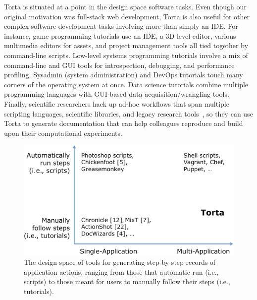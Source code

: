 Torta is situated at a point in the design space  software tasks.
%
%
Even though our original motivation was full-stack
web development, Torta is also useful for other complex software
development tasks involving more than simply an IDE. For instance,
game programming tutorials use an IDE, a 3D level editor, various
multimedia editors for assets, and project management tools all tied
together by command-line scripts. Low-level systems programming
tutorials involve a mix of command-line and GUI tools for introspection,
debugging, and performance profiling. Sysadmin (system administration)
and DevOps tutorials touch many corners of the operating system at once.
Data science tutorials combine multiple programming languages with
GUI-based data acquisition/wrangling tools. Finally, scientific
researchers hack up ad-hoc workflows that span multiple scripting
languages, scientific libraries, and legacy research
tools~\cite{GuoPhD2012}, so they can use Torta to generate documentation
that can help colleagues reproduce and build upon their computational
experiments.
%


\begin{figure}

\includegraphics[width=\columnwidth]{figures/torta/design-space.png}

\nocite{Bolin2005} %
\caption{The design space of tools for generating step-by-step records
of application actions, ranging from those that automatic run (i.e.,
scripts) to those meant for users to manually follow their steps (i.e.,
tutorials).}

\vspace{-0.5em} %
\label{fig:design-space}
\end{figure}


